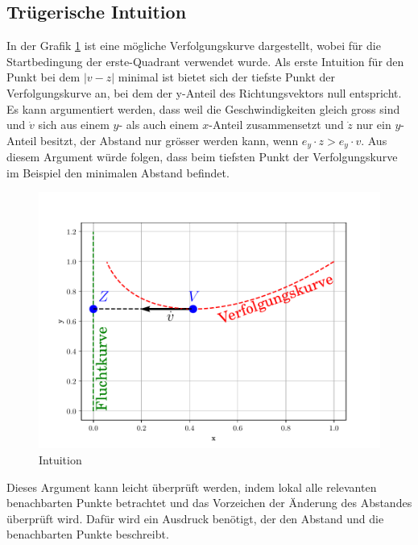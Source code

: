 \subsection{Trügerische Intuition}%
In der Grafik \ref{lambertw:grafic:intuition} ist eine mögliche Verfolgungskurve dargestellt, wobei für die Startbedingung der erste-Quadrant verwendet wurde.
Als erste Intuition für den Punkt bei dem $|v-z|$ minimal ist bietet sich der tiefste Punkt der Verfolgungskurve an, bei dem der y-Anteil des Richtungsvektors null entspricht.
Es kann argumentiert werden, dass weil die Geschwindigkeiten gleich gross sind und $\dot{v}$ sich aus einem $y$- als auch einem $x$-Anteil zusammensetzt und $\dot{z}$ nur ein $y$-Anteil besitzt, der Abstand nur grösser werden kann, wenn $e_y\cdot z>e_y\cdot v$.
Aus diesem Argument würde folgen, dass beim tiefsten Punkt der Verfolgungskurve im Beispiel den minimalen Abstand befindet.
%
\begin{figure}
	\centering
	\includegraphics[scale=0.7]{./papers/lambertw/Bilder/Intuition.pdf}
	\caption{Intuition}
	\label{lambertw:grafic:intuition}
\end{figure}
%
Dieses Argument kann leicht überprüft werden, indem lokal alle relevanten benachbarten Punkte betrachtet und das Vorzeichen der Änderung des Abstandes überprüft wird.
Dafür wird ein Ausdruck benötigt, der den Abstand und die benachbarten Punkte beschreibt.

